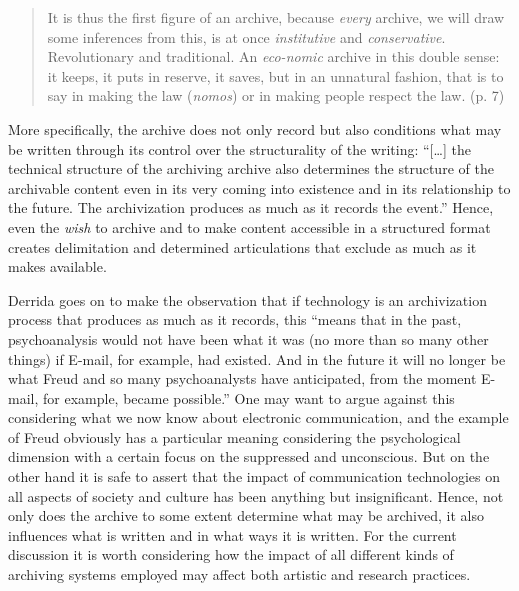 \documentclass[11pt,a4paper]{article}
\begin{document}
\begin{quote}
  It is thus the first figure of an archive, because \emph{every} archive, we will draw some inferences from this, is at once \emph{institutive} and \emph{conservative}. Revolutionary and traditional. An \emph{eco-nomic} archive in this double sense: it keeps, it puts in reserve, it saves, but in an unnatural fashion, that is to say in making the law (\emph{nomos}) or in making people respect the law. (p. 7)
\end{quote}

More specifically, the archive does not only record but also conditions what may be written through its control over the structurality of the writing: ``[\ldots] the technical structure of the archiving archive also determines the structure of the archivable content even in its very coming into existence and in its relationship to the future. The archivization produces as much as it records the event.'' \citep[p. 17]{derrida1998} Hence, even the \emph{wish} to archive and to make content accessible in a structured format creates delimitation and determined articulations that exclude as much as it makes available.

Derrida goes on to make the observation that if technology is an archivization process that produces as much as it records, this  ``means that in the past, psychoanalysis would not have been what it was (no more than so many other things) if E-mail, for example, had existed. And in the future it will no longer be what Freud and so many psychoanalysts have anticipated, from the moment E-mail, for example, became possible.'' \citep[][p. 17]{derrida1998} One may want to argue against this considering what we now know about electronic communication, and the example of Freud obviously has a particular meaning considering the psychological dimension with a certain focus on the suppressed and unconscious. But on the other hand it is safe to assert that the impact of communication technologies on all aspects of society and culture has been anything but insignificant. Hence, not only does the archive to some extent determine what may be archived, it also influences what is written and in what ways it is written. For the current discussion it is worth considering how the impact of all different kinds of archiving systems employed may affect both artistic and research practices.
\end{document}
